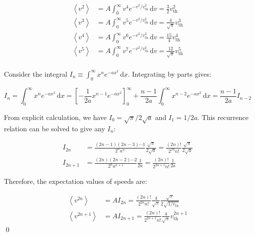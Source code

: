 \documentclass[12pt]{article}
\begin{document}
\begin{equation}
\begin{split}
    \left\langle v^{2} \right\rangle &= A \int_{0}^{\infty} v^{4} e^{-v^{2}/v_{\text{th}}^{2}} \, \mathrm{d}v = \frac{3}{2} v_{\text{th}}^{2} \\
    \left\langle v^{3} \right\rangle &= A \int_{0}^{\infty} v^{5} e^{-v^{2}/v_{\text{th}}^{2}} \, \mathrm{d}v = \frac{4}{\sqrt{\pi}} v_{\text{th}}^{3} \\
    \left\langle v^{4} \right\rangle &= A \int_{0}^{\infty} v^{6} e^{-v^{2}/v_{\text{th}}^{2}} \, \mathrm{d}v = \frac{15}{4} v_{\text{th}}^{4} \\
    \left\langle v^{5} \right\rangle &= A \int_{0}^{\infty} v^{7} e^{-v^{2}/v_{\text{th}}^{2}} \, \mathrm{d}v = \frac{12}{\sqrt{\pi}} v_{\text{th}}^{5} \\
\end{split}
\end{equation}

Consider the integral $I_{n} \equiv \int_{0}^{\infty} x^{n} e^{-ax^{2}} \, \mathrm{d}x$. Integrating by parts gives:

\begin{equation}
    I_{n} = \int_{0}^{\infty} x^{n} e^{-ax^{2}} \, \mathrm{d}x = \left[ -\frac{1}{2a} x^{n-1} e^{-ax^{2}} \right]_{0}^{\infty} + \frac{n-1}{2a} \int_{0}^{\infty} x^{n-2} e^{-ax^{2}} \, \mathrm{d}x = \frac{n-1}{2a} I_{n-2}
\end{equation}

From explicit calculation, we have $I_{0} = \sqrt{\pi}/2\sqrt{a}$ and $I_{1} = 1/2a$. This recurrence relation can be solved to give any $I_{n}$:

\begin{equation}
\begin{split}
    I_{2n} &= \frac{(2n-1)(2n-3)\cdots 1}{2^{n} a^{n}} \frac{\sqrt{\pi}}{2\sqrt{a}} = \frac{(2n)!}{2^{2n} n!} \frac{\sqrt{\pi}}{2\sqrt{a}} \\
    I_{2n+1} &= \frac{(2n)(2n-2)\cdots 2}{2^{n} a^{n+1}} \frac{1}{2a} = \frac{(2n)!}{2^{2n+1} n!} \frac{1}{2a}
\end{split}
\end{equation}

Therefore, the expectation values of speeds are:

\begin{equation}
\begin{split}
    \left\langle v^{2n} \right\rangle &= A I_{2n} = \frac{(2n)!}{2^{2n} n!} \frac{4}{\sqrt{\pi}} \frac{\sqrt{\pi}}{2\sqrt{1/v_{\text{th}}}} \\
    \left\langle v^{2n+1} \right\rangle &= A I_{2n+1} = \frac{(2n)!}{2^{2n+1} n!} \frac{4}{\sqrt{\pi}} v_{\text{th}}^{2n+1}  
\end{split}
\end{equation}
\qed
\end{document}
